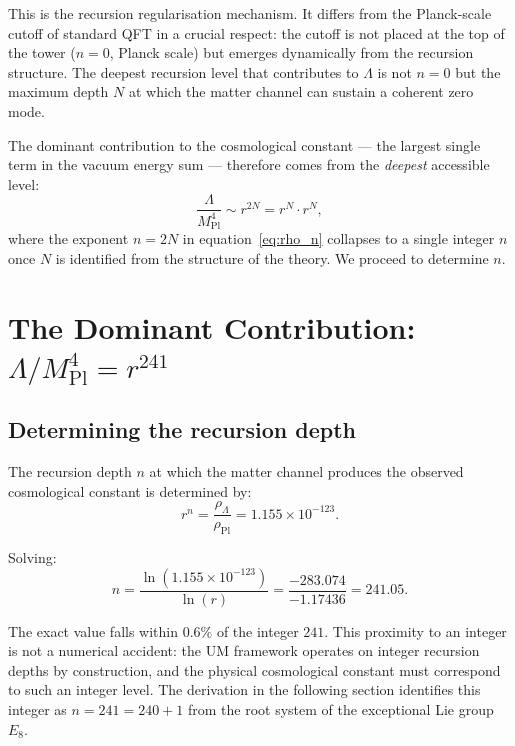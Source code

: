 \documentclass[12pt]{article}
\begin{document}
This is the recursion regularisation mechanism.  It differs from
the Planck-scale cutoff of standard QFT in a crucial respect:
the cutoff is not placed at the top of the tower ($n = 0$,
Planck scale) but emerges dynamically from the recursion structure.
The deepest recursion level that contributes to $\Lambda$ is not
$n = 0$ but the maximum depth $N$ at which the matter channel
can sustain a coherent zero mode.

The dominant contribution to the cosmological constant --- the
largest single term in the vacuum energy sum --- therefore comes
from the \emph{deepest} accessible level:
\begin{equation}
  \frac{\Lambda}{M_{\text{Pl}}^4}
    \sim r^{2N}
    = r^N \cdot r^N,
\end{equation}
where the exponent $n = 2N$ in equation~\eqref{eq:rho_n} collapses
to a single integer $n$ once $N$ is identified from the structure
of the theory.  We proceed to determine $n$.

\section{The Dominant Contribution: $\Lambda/M_{\mathrm{Pl}}^4 = r^{241}$}

\subsection{Determining the recursion depth}

The recursion depth $n$ at which the matter channel produces the
observed cosmological constant is determined by:
\begin{equation}
  r^n = \frac{\rho_\Lambda}{\rho_{\text{Pl}}}
      = 1.155 \times 10^{-123}.
  \label{eq:rn_obs}
\end{equation}

Solving:
\begin{equation}
  n = \frac{\ln(1.155 \times 10^{-123})}{\ln(r)}
    = \frac{-283.074}{-1.17436}
    = 241.05.
  \label{eq:n_exact}
\end{equation}

The exact value falls within $0.6\%$ of the integer $241$.  This
proximity to an integer is not a numerical accident: the UM
framework operates on integer recursion depths by construction, and
the physical cosmological constant must correspond to such an integer
level.  The derivation in the following section identifies this
integer as $n = 241 = 240 + 1$ from the root system of the
exceptional Lie group $E_8$.
\end{document}
